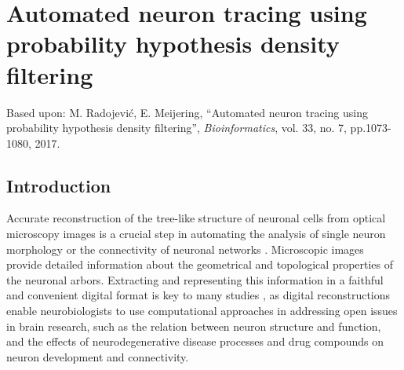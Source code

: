 %
%
\chpos{15mm}{8mm}
\chapter[Automated neuron tracing using probability hypothesis density filtering]{Automated neuron tracing using probability hypothesis density filtering}
\label{ch3:phd}

\vspace*{22em}
\begin{publish}
	Based upon: M. Radojevi\'{c}, E. Meijering, ``Automated neuron tracing using probability hypothesis density filtering'', \textit{Bioinformatics}, vol. 33, no. 7, pp.1073-1080, 2017.   
\end{publish}

\section{Introduction}
\label{sec:introduction}
Accurate reconstruction of the tree-like structure of neuronal cells from optical microscopy images is a crucial step in automating the analysis of single neuron morphology or the connectivity of neuronal networks \cite{meijering2010neuron, donohue2011automated, peng2015bigneuron}. Microscopic images provide detailed information about the geometrical and topological properties of the neuronal arbors. Extracting and representing this information in a faithful and convenient digital format is key to many studies \cite{ascoli2002computational, ascoli2007neuromorpho, svoboda2011past, senft2011brief, halavi2012digital, lu2015quantitative}, as digital reconstructions enable neurobiologists to use computational approaches in addressing open issues in brain research, such as the relation between neuron structure and function, and the effects of neurodegenerative disease processes and drug compounds on neuron development and connectivity.

